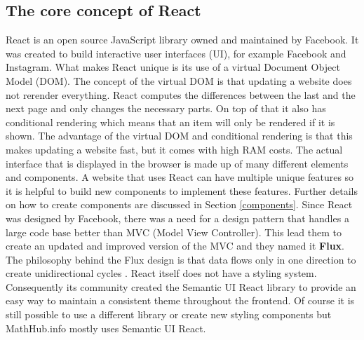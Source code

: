 \documentclass[11pt,a4paper]{article}
\begin{document}
\subsection{The core concept of React} \label{react}
React \cite{reactjs} is an open source JavaScript library owned and maintained by Facebook.
It was created to build interactive user interfaces (UI), for example Facebook and Instagram.
What makes React unique is its use of a virtual Document Object Model (DOM).
The concept of the virtual DOM is that updating a website does not rerender everything.
React computes the differences between the last and the next page and only changes the necessary parts.
On top of that it also has conditional rendering which means that an item will only be rendered if it is shown.
The advantage of the virtual DOM and conditional rendering is that this makes updating a website fast, but it comes with high RAM costs.
The actual interface that is displayed in the browser is made up of many different elements and components.
A website that uses React can have multiple unique features so it is helpful to build new components to implement these features.
Further details on how to create components are discussed in Section \ref{components}.
\newline \newline
Since React was designed by Facebook, there was a need for a design pattern that handles a large code base better than MVC (Model View Controller).
This lead them to create an updated and improved version of the MVC and they named it \textbf{Flux}.
The philosophy behind the Flux design is that data flows only in one direction to create unidirectional cycles \cite{flux}.
\newline \newline
React itself does not have a styling system.
Consequently its community created the Semantic UI React library \cite{semantic} to provide an easy way to maintain a consistent theme throughout the frontend.
Of course it is still possible to use a different library or create new styling components but MathHub.info mostly uses Semantic UI React.
\end{document}
